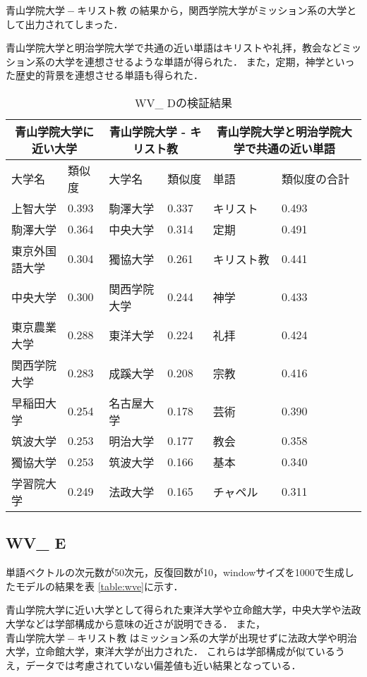 $ 青山学院大学 - キリスト教 $ の結果から，関西学院大学がミッション系の大学として出力されてしまった．

青山学院大学と明治学院大学で共通の近い単語はキリストや礼拝，教会などミッション系の大学を連想させるような単語が得られた．
また，定期，神学といった歴史的背景を連想させる単語も得られた．


\begin{table}[H]
\caption{WV\_ Dの検証結果}
\centering
\footnotesize
\begin{tabular}{ll|ll|ll}
\hline
\multicolumn{2}{c}{青山学院大学に近い大学} & \multicolumn{2}{c}{青山学院大学 - キリスト教} & \multicolumn{2}{c}{青山学院大学と明治学院大学で共通の近い単語}
\\ \hline
大学名 & 類似度 & 大学名 & 類似度 & 単語 & 類似度の合計
\\ \hline \hline
上智大学 & 0.393 & 駒澤大学 & 0.337 & キリスト & 0.493\\
駒澤大学 & 0.364 & 中央大学 & 0.314 & 定期 & 0.491\\
東京外国語大学 & 0.304 & 獨協大学 & 0.261 & キリスト教 & 0.441\\
中央大学 & 0.300 & 関西学院大学 & 0.244 & 神学 & 0.433\\
東京農業大学 & 0.288 & 東洋大学 & 0.224 & 礼拝 & 0.424\\
関西学院大学 & 0.283 & 成蹊大学 & 0.208 & 宗教 & 0.416\\
早稲田大学 & 0.254 & 名古屋大学 & 0.178 & 芸術 & 0.390\\
筑波大学 & 0.253 & 明治大学 & 0.177 & 教会 & 0.358\\
獨協大学 & 0.253 & 筑波大学 & 0.166 & 基本 & 0.340\\
学習院大学 & 0.249 & 法政大学 & 0.165 & チャペル & 0.311\\ \hline
\end{tabular}
\label{table:wvd}
\end{table}

\subsection{WV\_ E}
単語ベクトルの次元数が50次元，反復回数が10，windowサイズを1000で生成したモデルの結果を表 \ref{table:wve}に示す．

青山学院大学に近い大学として得られた東洋大学や立命館大学，中央大学や法政大学などは学部構成から意味の近さが説明できる．
また，$ 青山学院大学 - キリスト教 $ はミッション系の大学が出現せずに法政大学や明治大学，立命館大学，東洋大学が出力された．
これらは学部構成が似ているうえ，データでは考慮されていない偏差値も近い結果となっている．

